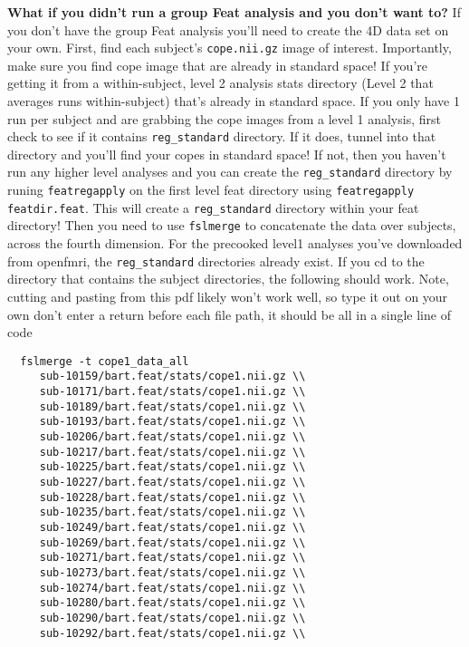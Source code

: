 \documentclass[titlepage,12pt] {article}
\begin{document}
     \item \textbf{What if you didn't run a group Feat analysis and you don't want to?}  If you don't have the group Feat analysis you'll need to create the 4D data set on your own.  First, find each subject's \verb+cope.nii.gz+ image of interest. Importantly, make sure you find cope image that are already in standard space!  If you're getting it from a within-subject, level 2 analysis stats directory (Level 2 that averages runs within-subject) that's already in standard space.  If you only have 1 run per subject and are grabbing the cope images from a level 1 analysis, first check to see if it contains \verb+reg_standard+ directory.  If it does, tunnel into that directory and you'll find your copes in standard space!  If not, then you haven't run any higher level analyses and you can create the \verb+reg_standard+ directory by runing \verb+featregapply+ on the first level feat directory using \verb+featregapply featdir.feat+.  This will create a \verb+reg_standard+ directory within your feat directory!  Then you need to use \verb+fslmerge+ to concatenate the data over subjects, across the fourth dimension.  For the  precooked level1 analyses you've downloaded from openfmri, the \verb+reg_standard+ directories already exist.  If you cd to the directory that contains the subject directories, the following should work.  Note, cutting and pasting from this pdf likely won't work well, so type it out on your own  don't enter a return before each file path, it should be all in a single line of code \\ 
     \begin{verbatim}  fslmerge -t cope1_data_all 
     sub-10159/bart.feat/stats/cope1.nii.gz \\
     sub-10171/bart.feat/stats/cope1.nii.gz \\
     sub-10189/bart.feat/stats/cope1.nii.gz \\
     sub-10193/bart.feat/stats/cope1.nii.gz \\
     sub-10206/bart.feat/stats/cope1.nii.gz \\
     sub-10217/bart.feat/stats/cope1.nii.gz \\
     sub-10225/bart.feat/stats/cope1.nii.gz \\
     sub-10227/bart.feat/stats/cope1.nii.gz \\
     sub-10228/bart.feat/stats/cope1.nii.gz \\
     sub-10235/bart.feat/stats/cope1.nii.gz \\
     sub-10249/bart.feat/stats/cope1.nii.gz \\
     sub-10269/bart.feat/stats/cope1.nii.gz \\
     sub-10271/bart.feat/stats/cope1.nii.gz \\
     sub-10273/bart.feat/stats/cope1.nii.gz \\
     sub-10274/bart.feat/stats/cope1.nii.gz \\
     sub-10280/bart.feat/stats/cope1.nii.gz \\
     sub-10290/bart.feat/stats/cope1.nii.gz \\
     sub-10292/bart.feat/stats/cope1.nii.gz \\
      \end{verbatim}
\end{document}
